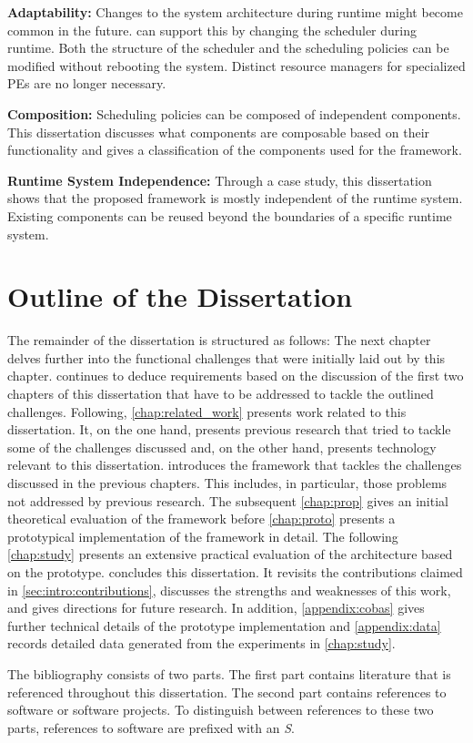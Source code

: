 \textbf{Adaptability:} Changes to the system architecture during runtime might become common in the future. \cobas{} can support this by changing the scheduler during runtime. Both the structure of the scheduler and the scheduling policies can be modified without rebooting the system. Distinct resource managers for specialized \acp{PE} are no longer necessary.

\textbf{Composition:} Scheduling policies can be composed of independent components. This dissertation discusses what components are composable based on their functionality and gives a classification of the components used for the \cobas{} framework.

\textbf{Runtime System Independence:} Through a case study, this dissertation shows that the proposed framework is mostly independent of the runtime system. Existing components can be reused beyond the boundaries of a specific runtime system.

\section{Outline of the Dissertation}

The remainder of the dissertation is structured as follows: The next chapter delves further into the functional challenges that were initially laid out by this chapter.  continues to deduce requirements based on the discussion of the first two chapters of this dissertation that have to be addressed to tackle the outlined challenges. Following, \cref{chap:related_work} presents work related to this dissertation. It, on the one hand, presents previous research that tried to tackle some of the challenges discussed and, on the other hand, presents technology relevant to this dissertation.  introduces the \cobas{} framework that tackles the challenges discussed in the previous chapters. This includes, in particular, those problems not addressed by previous research. The subsequent \cref{chap:prop} gives an initial theoretical evaluation of the \cobas{} framework before \cref{chap:proto} presents a prototypical implementation of the \cobas{} framework in detail. The following \cref{chap:study} presents an extensive practical evaluation of the \cobas{} architecture based on the prototype.  concludes this dissertation. It revisits the contributions claimed in \cref{sec:intro:contributions}, discusses the strengths and weaknesses of this work, and gives directions for future research. In addition, \cref{appendix:cobas} gives further technical details of the \cobas{} prototype implementation and \cref{appendix:data} records detailed data generated from the experiments in \cref{chap:study}.

The bibliography consists of two parts. The first part contains literature that is referenced throughout this dissertation. The second part contains references to software or software projects. To distinguish between references to these two parts, references to software are prefixed with an \emph{S}.
